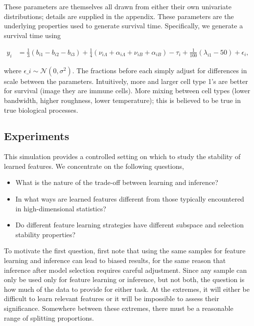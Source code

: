 These parameters are themselves all drawn from either their own univariate distributions; details are supplied in the appendix.
These parameters are the underlying properties used to generate survival time. Specifically, we generate a survival time using 

\begin{align}
y_i &= \frac{1}{3}\left(b_{i1} - b_{i2} - b_{i3}\right) + \frac{1}{4}\left(\nu_{i\Lambda} + \alpha_{i\Lambda} + \nu_{iB} + \alpha_{iB}\right) - \tau_{i} + \frac{1}{100}\left(\lambda_{i1} - 50\right) + \epsilon_{i},
\end{align}

where $\epsilon\_{i} \sim \mathcal{N}\left(0, \sigma^2\right)$. The fractions
before each simply adjust for differences in scale between the parameters.
Intuitively, more and larger cell type 1’s are better for survival (image they
are immune cells). More mixing between cell types (lower bandwidth, higher
roughness, lower temperature); this is believed to be true in true biological
processes.

\subsection{Experiments}

This simulation provides a controlled setting on which to study the stability of learned features. We concentrate on the following questions,

\begin{itemize}
\item What is the nature of the trade-off between learning and inference?
\item In what ways are learned features different from those typically encountered in high-dimensional statistics?
\item Do different feature learning strategies have different subspace and selection stability properties?
\end{itemize}

To motivate the first question, first note that using the same samples for feature learning and inference can lead to biased results, for the same reason that inference after model selection requires careful adjustment. Since any sample can only be used only for feature learning or inference, but not both, the question is how much of the data to provide for either task. At the extremes, it will either be difficult to learn relevant features or it will be impossible to assess their significance. Somewhere between these extremes, there must be a reasonable range of splitting proportions.

